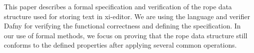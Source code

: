 This paper describes a formal specification and verification of the rope data structure used for storing text in xi-editor.
We are using the language and verifier Dafny for verifying the functional correctness and defining the specification.
In our use of formal methods, we focus on proving that the rope data structure still conforms to the defined properties after applying several common operations.
